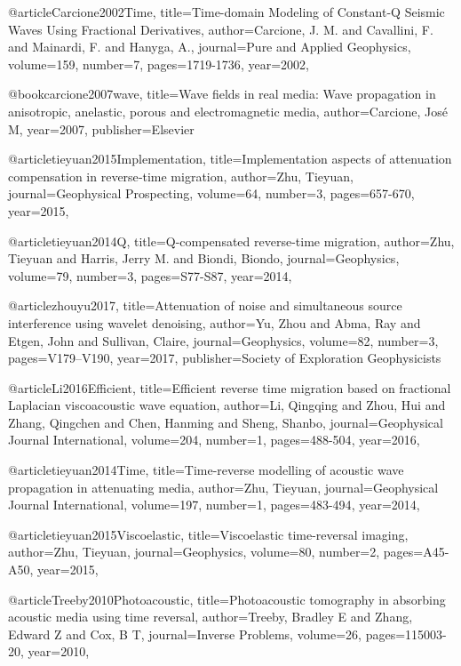 @article{Carcione2002Time,
  title={Time-domain Modeling of Constant-{Q} Seismic Waves Using Fractional Derivatives},
  author={Carcione, J. M. and Cavallini, F. and Mainardi, F. and Hanyga, A.},
  journal={Pure and Applied Geophysics},
  volume={159},
  number={7},
  pages={1719-1736},
  year={2002},
}

@book{carcione2007wave,
  title={Wave fields in real media: Wave propagation in anisotropic, anelastic, porous and electromagnetic media},
  author={Carcione, Jos{\'e} M},
  year={2007},
  publisher={Elsevier}
}

@article{tieyuan2015Implementation,
  title={Implementation aspects of attenuation compensation in reverse‐time migration},
  author={Zhu, Tieyuan},
  journal={Geophysical Prospecting},
  volume={64},
  number={3},
  pages={657-670},
  year={2015},
}

@article{tieyuan2014Q,
  title={Q-compensated reverse-time migration},
  author={Zhu, Tieyuan and Harris, Jerry M. and Biondi, Biondo},
  journal={Geophysics},
  volume={79},
  number={3},
  pages={S77-S87},
  year={2014},
}

@article{zhouyu2017,
  title={Attenuation of noise and simultaneous source interference using wavelet denoising},
  author={Yu, Zhou and Abma, Ray and Etgen, John and Sullivan, Claire},
  journal={Geophysics},
  volume={82},
  number={3},
  pages={V179--V190},
  year={2017},
  publisher={Society of Exploration Geophysicists}
}


@article{Li2016Efficient,
  title={Efficient reverse time migration based on fractional {L}aplacian viscoacoustic wave equation},
  author={Li, Qingqing and Zhou, Hui and Zhang, Qingchen and Chen, Hanming and Sheng, Shanbo},
  journal={Geophysical Journal International},
  volume={204},
  number={1},
  pages={488-504},
  year={2016},
}

@article{tieyuan2014Time,
  title={Time-reverse modelling of acoustic wave propagation in attenuating media},
  author={Zhu, Tieyuan},
  journal={Geophysical Journal International},
  volume={197},
  number={1},
  pages={483-494},
  year={2014},
}

@article{tieyuan2015Viscoelastic,
  title={Viscoelastic time-reversal imaging},
  author={Zhu, Tieyuan},
  journal={Geophysics},
  volume={80},
  number={2},
  pages={A45-A50},
  year={2015},
}

@article{Treeby2010Photoacoustic,
  title={Photoacoustic tomography in absorbing acoustic media using time reversal},
  author={Treeby, Bradley E and Zhang, Edward Z and Cox, B T},
  journal={Inverse Problems},
  volume={26},
  pages={115003-20},
  year={2010},
}


